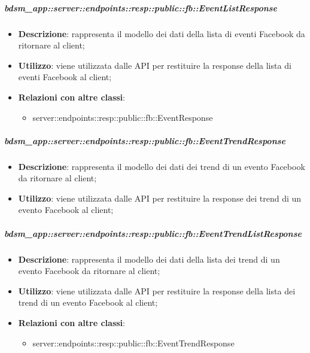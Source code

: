     \subparagraph{bdsm\_app::server::endpoints::resp::public::fb::EventListResponse} %
    \label{subp:bdsm_app_server_endpoints_resp_public_fb_eventlistresponse}
    \begin{itemize}
      \item \textbf{Descrizione}: rappresenta il modello dei dati della lista di eventi Facebook da ritornare al client;
      \item \textbf{Utilizzo}: viene utilizzata dalle API per restituire la response della lista di eventi Facebook al client;
      \item \textbf{Relazioni con altre classi}:
        \begin{itemize}
          \item server::endpoints::resp::public::fb::EventResponse
        \end{itemize}
      \end{itemize}

    \subparagraph{bdsm\_app::server::endpoints::resp::public::fb::EventTrendResponse} %
    \label{subp:bdsm_app_server_endpoints_resp_public_fb_eventtrendresponse}
    \begin{itemize}
      \item \textbf{Descrizione}: rappresenta il modello dei dati dei trend di un evento Facebook da ritornare al client;
      \item \textbf{Utilizzo}: viene utilizzata dalle API per restituire la response dei trend di un evento Facebook al client;
      \end{itemize}

    \subparagraph{bdsm\_app::server::endpoints::resp::public::fb::EventTrendListResponse} %
    \label{subp:bdsm_app_server_endpoints_resp_public_fb_eventtrendlistresponse}
    \begin{itemize}
      \item \textbf{Descrizione}: rappresenta il modello dei dati della lista dei trend di un evento Facebook da ritornare al client;
      \item \textbf{Utilizzo}: viene utilizzata dalle API per restituire la response della lista dei trend di un evento Facebook al client;
      \item \textbf{Relazioni con altre classi}:
        \begin{itemize}
          \item server::endpoints::resp::public::fb::EventTrendResponse
        \end{itemize}
      \end{itemize}


